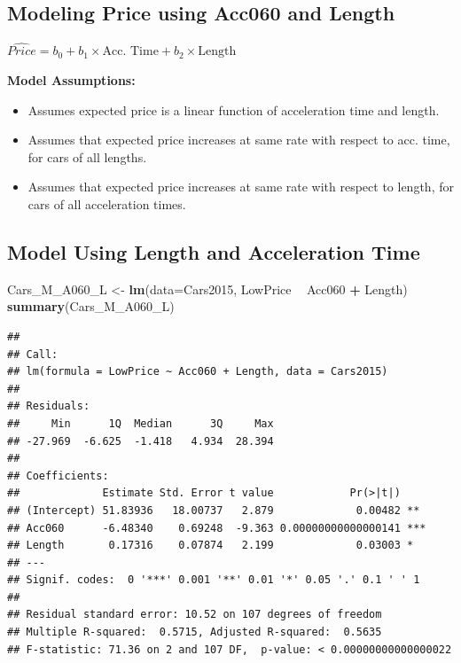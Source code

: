\documentclass[]{book}
\newenvironment{Shaded}{\begin{snugshade}}{\end{snugshade}}
\newcommand{\KeywordTok}[1]{\textcolor[rgb]{0.13,0.29,0.53}{\textbf{#1}}}
\newcommand{\DataTypeTok}[1]{\textcolor[rgb]{0.13,0.29,0.53}{#1}}
\newcommand{\StringTok}[1]{\textcolor[rgb]{0.31,0.60,0.02}{#1}}
\newcommand{\OperatorTok}[1]{\textcolor[rgb]{0.81,0.36,0.00}{\textbf{#1}}}
\newcommand{\NormalTok}[1]{#1}
\begin{document}
\subsection{Modeling Price using Acc060 and
Length}\label{modeling-price-using-acc060-and-length}

\(\widehat{Price} = b_0 + b_1\times\text{Acc. Time} + b_2\times\text{Length}\)

\textbf{Model Assumptions:}

\begin{itemize}
\item
  Assumes expected price is a linear function of acceleration time and
  length.
\item
  Assumes that expected price increases at same rate with respect to
  acc. time, for cars of all lengths.
\item
  Assumes that expected price increases at same rate with respect to
  length, for cars of all acceleration times.
\end{itemize}

\subsection{Model Using Length and Acceleration
Time}\label{model-using-length-and-acceleration-time}

\begin{Shaded}
\begin{Highlighting}[]
\NormalTok{Cars_M_A060_L <-}\StringTok{ }\KeywordTok{lm}\NormalTok{(}\DataTypeTok{data=}\NormalTok{Cars2015, LowPrice }\OperatorTok{~}\StringTok{ }\NormalTok{Acc060 }\OperatorTok{+}\StringTok{ }\NormalTok{Length)}
\KeywordTok{summary}\NormalTok{(Cars_M_A060_L)}
\end{Highlighting}
\end{Shaded}

\begin{verbatim}
## 
## Call:
## lm(formula = LowPrice ~ Acc060 + Length, data = Cars2015)
## 
## Residuals:
##     Min      1Q  Median      3Q     Max 
## -27.969  -6.625  -1.418   4.934  28.394 
## 
## Coefficients:
##             Estimate Std. Error t value            Pr(>|t|)    
## (Intercept) 51.83936   18.00737   2.879             0.00482 ** 
## Acc060      -6.48340    0.69248  -9.363 0.00000000000000141 ***
## Length       0.17316    0.07874   2.199             0.03003 *  
## ---
## Signif. codes:  0 '***' 0.001 '**' 0.01 '*' 0.05 '.' 0.1 ' ' 1
## 
## Residual standard error: 10.52 on 107 degrees of freedom
## Multiple R-squared:  0.5715, Adjusted R-squared:  0.5635 
## F-statistic: 71.36 on 2 and 107 DF,  p-value: < 0.00000000000000022
\end{verbatim}
\end{document}
